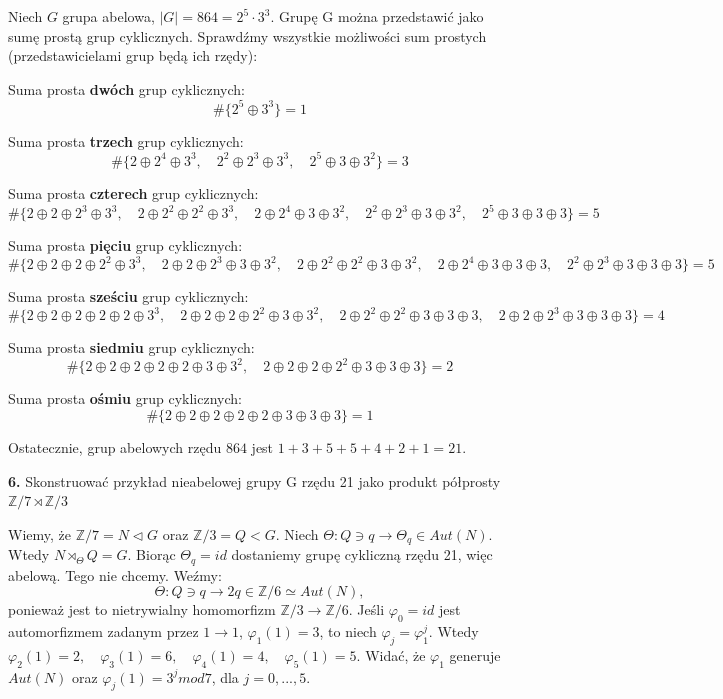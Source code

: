 \documentclass{article}
\begin{document}
Niech $G$ grupa abelowa, $|G|=864=2^5\cdot 3^3$. Grupę G można przedstawić jako sumę prostą grup cyklicznych. Sprawdźmy wszystkie możliwości sum prostych (przedstawicielami grup będą ich rzędy):
\begin{center}
Suma prosta \textbf{dwóch} grup cyklicznych:
$$\#\{2^5\oplus3^3\}=1$$

Suma prosta \textbf{trzech} grup cyklicznych:
$$\#\{2\oplus2^4\oplus3^3,\quad2^2\oplus2^3\oplus3^3,\quad2^5\oplus3\oplus3^2\}=3$$

Suma prosta \textbf{czterech} grup cyklicznych:
$$\#\{2\oplus2\oplus2^3\oplus3^3,
\quad2\oplus2^2\oplus2^2\oplus3^3,
\quad2\oplus2^4\oplus3\oplus3^2,
\quad2^2\oplus2^3\oplus3\oplus3^2,
\quad2^5\oplus3\oplus3\oplus3\}=5$$


Suma prosta \textbf{pięciu} grup cyklicznych:
$$\#\{2\oplus2\oplus2\oplus2^2\oplus3^3,
\quad2\oplus2\oplus2^3\oplus3\oplus3^2,
\quad2\oplus2^2\oplus2^2\oplus3\oplus3^2,
\quad2\oplus2^4\oplus3\oplus3\oplus3,
\quad2^2\oplus2^3\oplus3\oplus3\oplus3
\}=5$$

Suma prosta \textbf{sześciu} grup cyklicznych:
$$\#\{2\oplus2\oplus2\oplus2\oplus2\oplus3^3,
\quad2\oplus2\oplus2\oplus2^2\oplus3\oplus3^2,
\quad2\oplus2^2\oplus2^2\oplus3\oplus3\oplus3,
\quad2\oplus2\oplus2^3\oplus3\oplus3\oplus3
\}=4$$

Suma prosta \textbf{siedmiu} grup cyklicznych:
$$\#\{2\oplus2\oplus2\oplus2\oplus2\oplus3\oplus3^2,
\quad2\oplus2\oplus2\oplus2^2\oplus3\oplus3\oplus3
\}=2$$

Suma prosta \textbf{ośmiu} grup cyklicznych:
$$\#\{2\oplus2\oplus2\oplus2\oplus2\oplus3\oplus3\oplus3
\}=1$$


Ostatecznie, grup abelowych rzędu $864$ jest $1+3+5+5+4+2+1=21$.
\end{center}

\begin{center}
\Large \textbf{6.} Skonstruować przykład nieabelowej grupy G rzędu 21 jako produkt półprosty $\mathds{Z}/7\rtimes \mathds{Z}/3$
\end{center}
Wiemy, że $\mathds{Z}/7=N\triangleleft G$ oraz $\mathds{Z}/3=Q<G$. Niech $\Theta:Q\ni q\rightarrow \Theta_q\in Aut(N)$. Wtedy $N\rtimes_\Theta Q=G$. Biorąc $\Theta_q=id$ dostaniemy grupę cykliczną rzędu 21, więc abelową. Tego nie chcemy. Weźmy: $$\Theta:Q\ni q\rightarrow2q\in \mathds{Z}/6\simeq Aut(N),$$ ponieważ jest to nietrywialny homomorfizm $\mathds{Z}/3\rightarrow\mathds{Z}/6 $. Jeśli $\varphi_0=id$ jest automorfizmem zadanym przez $1\rightarrow1$, $\varphi_1(1)=3$, to niech $\varphi_j=\varphi_1^j$. Wtedy $\varphi_2(1)=2,\quad\varphi_3(1)=6,\quad\varphi_4(1)=4,\quad\varphi_5(1)=5$. Widać, że $\varphi_1$ generuje $Aut(N)$ oraz $\varphi_j(1)=3^j mod7$, dla $j=0,...,5$.
\end{document}
